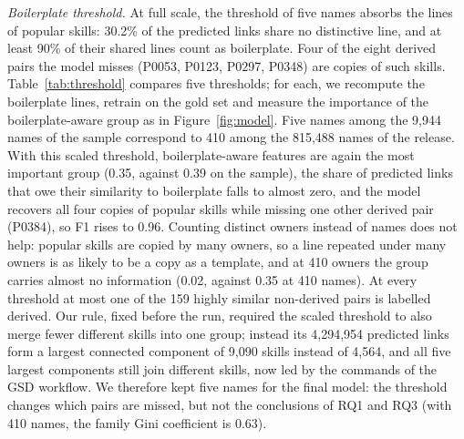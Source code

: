 \documentclass[sigconf,screen]{acmart}
\begin{document}
\emph{Boilerplate threshold.} At full scale, the threshold of five names absorbs the lines of popular skills: 30.2\% of the predicted links share no distinctive line, and at least 90\% of their shared lines count as boilerplate. Four of the eight derived pairs the model misses (P0053, P0123, P0297, P0348) are copies of such skills. Table~\ref{tab:threshold} compares five thresholds; for each, we recompute the boilerplate lines, retrain on the gold set and measure the importance of the boilerplate-aware group as in Figure~\ref{fig:model}. Five names among the 9,944 names of the sample correspond to 410 among the 815,488 names of the release. With this scaled threshold, boilerplate-aware features are again the most important group (0.35, against 0.39 on the sample), the share of predicted links that owe their similarity to boilerplate falls to almost zero, and the model recovers all four copies of popular skills while missing one other derived pair (P0384), so F1 rises to 0.96. Counting distinct owners instead of names does not help: popular skills are copied by many owners, so a line repeated under many owners is as likely to be a copy as a template, and at 410 owners the group carries almost no information (0.02, against 0.35 at 410 names). At every threshold at most one of the 159 highly similar non-derived pairs is labelled derived. Our rule, fixed before the run, required the scaled threshold to also merge fewer different skills into one group; instead its 4,294,954 predicted links form a largest connected component of 9,090 skills instead of 4,564, and all five largest components still join different skills, now led by the commands of the GSD workflow. We therefore kept five names for the final model: the threshold changes which pairs are missed, but not the conclusions of RQ1 and RQ3 (with 410 names, the family Gini coefficient is 0.63).

\begin{table}[t]
\caption{Sensitivity to the boilerplate threshold (gradient boosting, gold set): a line is boilerplate if it occurs under at least $k$ distinct names or owners. FP: highly similar non-derived pairs labelled derived; Imp.: permutation importance of the boilerplate-aware group.}
\label{tab:threshold}
\small
{}
\end{table}
\end{document}
